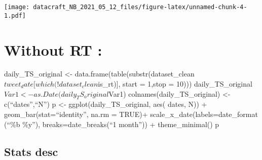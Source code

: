 \documentclass[
]{article}
\newenvironment{Shaded}{\begin{snugshade}}{\end{snugshade}}
\newcommand{\DataTypeTok}[1]{\textcolor[rgb]{0.13,0.29,0.53}{#1}}
\newcommand{\DecValTok}[1]{\textcolor[rgb]{0.00,0.00,0.81}{#1}}
\newcommand{\KeywordTok}[1]{\textcolor[rgb]{0.13,0.29,0.53}{\textbf{#1}}}
\newcommand{\NormalTok}[1]{#1}
\newcommand{\OperatorTok}[1]{\textcolor[rgb]{0.81,0.36,0.00}{\textbf{#1}}}
\newcommand{\OtherTok}[1]{\textcolor[rgb]{0.56,0.35,0.01}{#1}}
\newcommand{\StringTok}[1]{\textcolor[rgb]{0.31,0.60,0.02}{#1}}
\begin{document}
\begin{Shaded}
\end{Shaded}

\texttt{[image: datacraft\_NB\_2021\_05\_12\_files/figure-latex/unnamed-chunk-4-1.pdf]}

\hypertarget{without-rt}{%
\section{Without RT :}\label{without-rt}}

daily\_TS\_original \textless-
data.frame(table(substr(dataset\_clean\(tweet_date[which(!dataset_clean\)is\_rt){]},
start = 1,stop = 10)))
daily\_TS\_original\(Var1 <- as.Date(daily_TS_original\)Var1)
colnames(daily\_TS\_original) \textless- c(``dates'',``N'') p \textless-
ggplot(daily\_TS\_original, aes( dates, N)) +
geom\_bar(stat=``identity'', na.rm = TRUE)+
scale\_x\_date(labels=date\_format (``\%b \%y''),
breaks=date\_breaks(``1 month'')) + theme\_minimal() p

\hypertarget{stats-desc}{%
\subsection{Stats desc}\label{stats-desc}}
\end{document}
